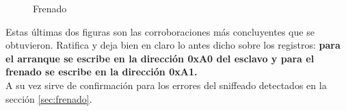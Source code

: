 \documentclass[main]{subfiles}
\begin{document}
\begin{figure} [h!]
\centering
  \caption{Frenado}
  \label{fig:MSP_frenado}
\end{figure}

Estas últimas dos figuras son las corroboraciones más concluyentes que se obtuvieron. Ratifica y deja bien en claro lo antes dicho sobre los registros: \textbf{para el arranque se escribe en la dirección 0xA0 del esclavo y para el frenado se escribe en la dirección 0xA1.}\\

A su vez sirve de confirmación para los errores del sniffeado detectados en la sección \ref{sec:frenado}.
\end{document}
